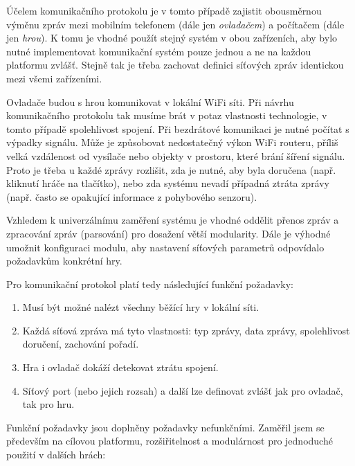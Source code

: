 \documentclass[thesis=B,czech,hidelinks]{FITthesis}[2012/06/26] %
\begin{document}
Účelem komunikačního protokolu je v tomto případě zajistit obousměrnou výměnu zpráv mezi mobilním telefonem (dále jen \textit{ovladačem}) a počítačem (dále jen \textit{hrou}). K tomu je vhodné použít stejný systém v obou zařízeních, aby bylo nutné implementovat komunikační systém pouze jednou a ne na každou platformu zvlášť. Stejně tak je třeba zachovat definici síťových zpráv identickou mezi všemi zařízeními.

Ovladače budou s hrou komunikovat v lokální WiFi síti. Při návrhu komunikačního protokolu tak musíme brát v potaz vlastnosti technologie, v tomto případě spolehlivost spojení. Při bezdrátové komunikaci je nutné počítat s výpadky signálu. Může je způsobovat nedostatečný výkon WiFi routeru, příliš velká vzdálenost od vysílače nebo objekty v prostoru, které brání šíření signálu. Proto je třeba u každé zprávy rozlišit, zda je nutné, aby byla doručena (např. kliknutí hráče na tlačítko), nebo zda systému nevadí případná ztráta zprávy (např. často se opakující informace z pohybového senzoru). 

Vzhledem k univerzálnímu zaměření systému je vhodné oddělit přenos zpráv a zpracování zpráv (parsování) pro dosažení větší modularity. Dále je výhodné umožnit konfiguraci modulu, aby nastavení síťových parametrů odpovídalo požadavkům konkrétní hry.

Pro komunikační protokol platí tedy následující funkční požadavky:

\begin{enumerate}
	\item Musí být možné nalézt všechny běžící hry v lokální síti.
	\item Každá síťová zpráva má tyto vlastnosti: typ zprávy, data zprávy, spolehlivost doručení, zachování pořadí.
	\item Hra i ovladač dokáží detekovat ztrátu spojení.
	\item Síťový port (nebo jejich rozsah) a další lze definovat zvlášť jak pro ovladač, tak pro hru.
\end{enumerate}

Funkční požadavky jsou doplněny požadavky nefunkčními. Zaměřil jsem se především na cílovou platformu, rozšiřitelnost a modulárnost pro jednoduché použití v dalších hrách:
\end{document}
